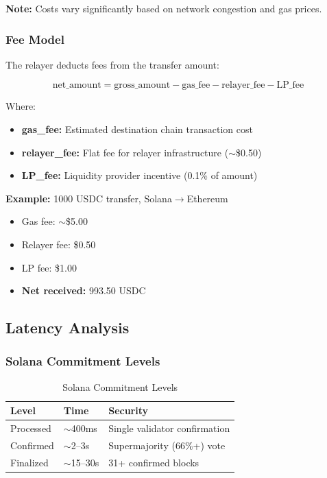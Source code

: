 \documentclass[11pt,a4paper,twoside]{article}
\begin{document}
\textbf{Note:} Costs vary significantly based on network congestion and gas prices.

\subsubsection{Fee Model}

The relayer deducts fees from the transfer amount:

\begin{equation}
\text{net\_amount} = \text{gross\_amount} - \text{gas\_fee} - \text{relayer\_fee} - \text{LP\_fee}
\end{equation}

Where:
\begin{itemize}
    \item \textbf{gas\_fee:} Estimated destination chain transaction cost
    \item \textbf{relayer\_fee:} Flat fee for relayer infrastructure ($\sim$\$0.50)
    \item \textbf{LP\_fee:} Liquidity provider incentive (0.1\% of amount)
\end{itemize}

\textbf{Example:} 1000 USDC transfer, Solana$\rightarrow$Ethereum
\begin{itemize}
    \item Gas fee: $\sim$\$5.00
    \item Relayer fee: \$0.50
    \item LP fee: \$1.00
    \item \textbf{Net received:} 993.50 USDC
\end{itemize}

\subsection{Latency Analysis}

\subsubsection{Solana Commitment Levels}

\begin{table}[H]
\centering
\caption{Solana Commitment Levels}
\label{tab:solana-commitment}
\begin{tabular}{@{}lll@{}}
\toprule
\textbf{Level} & \textbf{Time} & \textbf{Security} \\
\midrule
Processed & $\sim$400ms & Single validator confirmation \\
Confirmed & $\sim$2--3s & Supermajority (66\%+) vote \\
Finalized & $\sim$15--30s & 31+ confirmed blocks \\
\bottomrule
\end{tabular}
\end{table}
\end{document}
